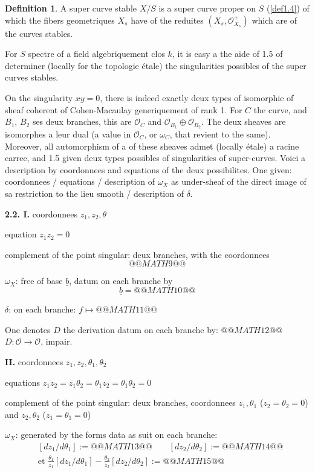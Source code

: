 \documentclass[11pt,a4paper]{article}
\theoremstyle{plain}
\theoremstyle{definition}
\newtheorem{definition}[theorem]{Definition}
\begin{document}
\begin{definition}\label{def2.1}
A super curve stable $X/S$ is a super curve proper on $S$ (\ref{def1.4}) of which the fibers geometriques $X_s$ have of the reduites $(X_s, \mathcal{O}_{X_s}^+)$ which are of the curves stables.
\end{definition}

For $S$ spectre of a field algebriquement clos $k$, it is easy a the aide of 1.5 of determiner (locally for the topologie étale) the singularities possibles of the super curves stables.

On the singularity $xy = 0$, there is indeed exactly deux types of isomorphie of sheaf coherent of Cohen-Macaulay generiquement of rank 1. For $C$ the curve, and $B_1$, $B_2$ ses deux branches, this are $\mathcal{O}_C$ and $\mathcal{O}_{B_1} \oplus \mathcal{O}_{B_2}$. The deux sheaves are isomorphes a leur dual (a value in $\mathcal{O}_C$, or $\omega_C$, that revient to the same). Moreover, all automorphism of a of these sheaves admet (locally étale) a racine carree, and 1.5 given deux types possibles of singularities of super-curves. Voici a description by coordonnees and equations of the deux possibilites. One given: coordonnees / equations / description of $\omega_X$ as under-sheaf of the direct image of sa restriction to the lieu smooth / description of $\delta$.

\medskip

\noindent \textbf{2.2. I.} coordonnees $z_1, z_2, \theta$

equation $z_1 z_2 = 0$

complement of the point singular: deux branches, with the coordonnees
\[
@@MATH9@@
\]

$\omega_X$: free of base $\underline{b}$, datum on each branche by
\[
\underline{b} = @@MATH10@@
\]

$\delta$: on each branche: $f \mapsto @@MATH11@@$

One denotes $D$ the derivation datum on each branche by: $@@MATH12@@$ $D : \mathcal{O} \to \mathcal{O}$, impair.

\medskip

\noindent \textbf{II.} coordonnees $z_1, z_2, \theta_1, \theta_2$

equations $z_1 z_2 = z_1\theta_2 = \theta_1 z_2 = \theta_1\theta_2 = 0$

complement of the point singular: deux branches, coordonnees $z_1, \theta_1$ ($z_2 = \theta_2 = 0$) and $z_2, \theta_2$ ($z_1 = \theta_1 = 0$)

$\omega_X$: generated by the forms data as suit on each branche:
\[
\begin{aligned}
&[dz_1/d\theta_1] := @@MATH13@@ \qquad [dz_2/d\theta_2] := @@MATH14@@ \\
&\text{et } \frac{\theta_1}{z_1}[dz_1/d\theta_1] - \frac{\theta_2}{z_2}[dz_2/d\theta_2] := @@MATH15@@
\end{aligned}
\]
\end{document}
